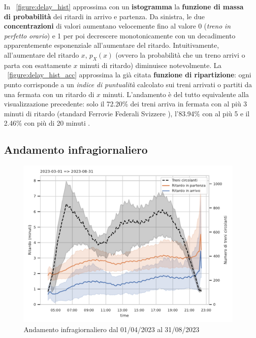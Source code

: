 \documentclass[12pt,italian]{report}
\begin{document}
In \figurename~\ref{figure:delay_hist} approssima con un
\textbf{istogramma} la \textbf{funzione di massa di probabilità} dei
ritardi in arrivo e partenza.  Da sinistra, le due
\textbf{concentrazioni} di valori aumentano velocemente fino al valore
0 (\textit{treno in perfetto orario}) e 1 per poi decrescere
monotonicamente con un decadimento apparentemente esponenziale
all'aumentare del ritardo.  Intuitivamente, all'aumentare del ritardo
$x$, $p_X(x)$ (ovvero la probabilità che un treno arrivi o parta con
esattamente $x$ minuti di ritardo) diminuisce notevolmente.  La
\figurename~\ref{figure:delay_hist_acc} approssima la già citata
\textbf{funzione di ripartizione}: ogni punto corrisponde a un
\textit{indice di puntualità} calcolato sui treni arrivati o partiti
da una fermata con un ritardo di $x$ minuti.  L'andamento è del tutto
equivalente alla visualizzazione precedente: solo il 72.20\% dei treni
arriva in fermata con al più 3 minuti di ritardo (standard Ferrovie
Federali Svizzere \cite{SbbPuntualita}), l'83.94\% con al più 5 e il
2.46\% con più di 20 minuti \cite[G]{StatJup}.

\subsection{Andamento infragiornaliero}

\begin{figure}[h]
    \includegraphics[width=1\textwidth]{images/intraday_delay.pdf}
    \caption{Andamento infragiornaliero dal 01/04/2023 al
        31/08/2023~}
    \label{figure:intraday_delay}
\end{figure}
\end{document}
